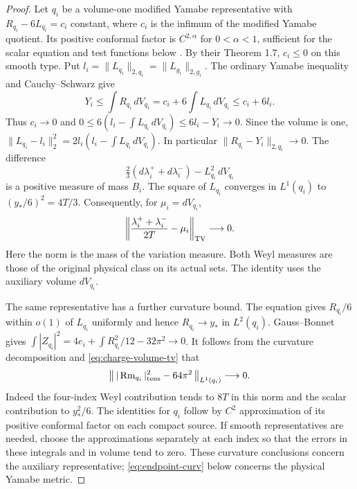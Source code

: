 \begin{proof}
Let \(q_i\) be a volume-one modified Yamabe representative with
\(R_{q_i}-6L_{q_i}=c_i\) constant, where \(c_i\) is the infimum of
the modified Yamabe quotient. Its positive conformal factor is
\(C^{2,\alpha}\) for \(0<\alpha<1\), sufficient for the scalar
equation and test functions below
\cite[Lemma 2.1 and proof of Theorem 1.4]{ChenZhu2014Conformal}.
By their Theorem 1.7, \(c_i\le0\) on this smooth type. Put
\(l_i=\|L_{q_i}\|_{2,q_i}=\|L_{g_i}\|_{2,g_i}\). The
ordinary Yamabe inequality and Cauchy--Schwarz give
\[
 Y_i\le\int R_{q_i}\,dV_{q_i}
      =c_i+6\int L_{q_i}\,dV_{q_i}\le c_i+6l_i.
\]
Thus \(c_i\to0\) and \(0\le6(l_i-\int L_{q_i}\,dV_{q_i})
\le6l_i-Y_i\to0\). Since the volume is one,
\(\|L_{q_i}-l_i\|_2^2=2l_i(l_i-\int L_{q_i}\,dV_{q_i})\).
In particular \(\|R_{q_i}-Y_i\|_{2,q_i}\to0\).
The difference
\[
 \tfrac23(d\lambda_i^++d\lambda_i^-)-L_{q_i}^2\,dV_{q_i}
\]
is a positive measure of mass \(B_i\). The square of \(L_{q_i}\)
converges in \(L^1(q_i)\) to \((y_*/6)^2=4T/3\).
Consequently, for \(\mu_i=dV_{q_i}\),
\begin{equation}\label{eq:charge-volume-tv}
 \left\|\frac{\lambda_i^++\lambda_i^-}{2T}-\mu_i\right\|_{\rm TV}
 \longrightarrow0.
\end{equation}
Here the norm is the mass of the variation measure. Both Weyl
measures are those of the original physical class on its actual sets.
The identity uses the auxiliary volume \(dV_{q_i}\).

The same representative has a further curvature bound. The equation
gives \(R_{q_i}/6\) within \(o(1)\) of \(L_{q_i}\) uniformly and
hence \(R_{q_i}\to y_*\) in \(L^2(q_i)\). Gauss--Bonnet gives
\(\int|Z_{q_i}|^2=4e_i+\int R_{q_i}^2/12-32\pi^2\to0\).
It follows from the curvature decomposition and
\eqref{eq:charge-volume-tv} that
\[
 \big\|\,|\operatorname{Rm}_{q_i}|_{\rm tens}^2-64\pi^2\,\big\|_{L^1(q_i)}
 \longrightarrow0.
\]
Indeed the four-index Weyl contribution tends to \(8T\) in this
norm and the scalar contribution to \(y_*^2/6\). The identities
for \(q_i\) follow by \(C^2\) approximation of its positive
conformal factor on each compact source. If smooth representatives
are needed, choose the approximations separately at each index so
that the errors in these integrals and in volume tend to zero.
These curvature conclusions concern the auxiliary representative;
\eqref{eq:endpoint-curv} below concerns the physical Yamabe metric.


\end{proof}
